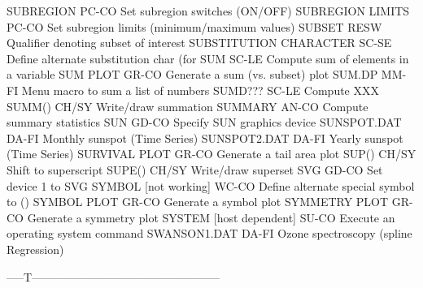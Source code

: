 SUBREGION                   PC-CO Set subregion switches (ON/OFF)
SUBREGION LIMITS            PC-CO Set subregion limits (minimum/maximum values)
SUBSET                      RESW  Qualifier denoting subset of interest
SUBSTITUTION CHARACTER      SC-SE Define alternate substitution char (for \)
SUM                         SC-LE Compute sum of elements in a variable
SUM PLOT                    GR-CO Generate a sum (vs. subset) plot
SUM.DP                      MM-FI Menu macro to sum a list of numbers
SUMD???                     SC-LE Compute XXX
SUMM()                      CH/SY Write/draw summation
SUMMARY                     AN-CO Compute summary statistics
SUN                         GD-CO Specify SUN graphics device
SUNSPOT.DAT                 DA-FI Monthly sunspot (Time Series)
SUNSPOT2.DAT                DA-FI Yearly sunspot (Time Series)
SURVIVAL PLOT               GR-CO Generate a tail area plot
SUP()                       CH/SY Shift to superscript
SUPE()                      CH/SY Write/draw superset
SVG                         GD-CO Set device 1 to SVG
SYMBOL [not working]        WC-CO Define alternate special symbol to ()
SYMBOL PLOT                 GR-CO Generate a symbol plot
SYMMETRY PLOT               GR-CO Generate a symmetry plot
SYSTEM [host dependent]     SU-CO Execute an operating system command
SWANSON1.DAT                DA-FI Ozone spectroscopy (spline Regression)

-----T--------------------------------------------------

